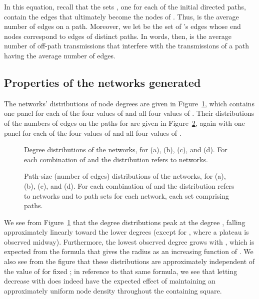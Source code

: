 \documentclass{article}
\begin{document}
In this equation, recall that the sets , one for each of the
initial directed paths, contain the edges that ultimately become the nodes of
. Thus,  is the average number of edges on a
path. Moreover, we let  be the set of 's edges whose end nodes
correspond to edges of distinct paths. In words, then,  is the average
number of off-path transmissions that interfere with the transmissions of a path
having the average number of edges.

\subsection{Properties of the networks generated}

The  networks' distributions of node degrees are given in
Figure~\ref{fig7}, which contains one panel for each of the four values of
 and all four values of . Their distributions of the numbers of edges
on the  paths for  are given in Figure~\ref{fig8}, again with one
panel for each of the four values of  and all four values of .

\begin{figure}[p]
\centering
{}
\caption{Degree distributions of the  networks, for  (a),
 (b),  (c), and  (d). For each combination of
 and  the distribution refers to  networks.}
\label{fig7}
\end{figure}

\begin{figure}[p]
\centering
{}
\caption{Path-size (number of edges) distributions of the  networks, for
 (a),  (b),  (c), and  (d). For each
combination of  and  the distribution refers to  networks and to
 path sets for each network, each set comprising  paths.}
\label{fig8}
\end{figure}

We see from Figure~\ref{fig7} that the degree distributions peak at the degree
, falling approximately linearly toward the lower degrees (except for
, where a plateau is observed midway). Furthermore, the lowest
observed degree grows with , which is expected from the formula that
gives the radius  as an increasing function of . We also see from the
figure that these distributions are approximately independent of the value of
 for fixed ; in reference to that same formula, we see that letting
 decrease with  does indeed have the expected effect of maintaining an
approximately uniform node density throughout the containing square.
\end{document}
